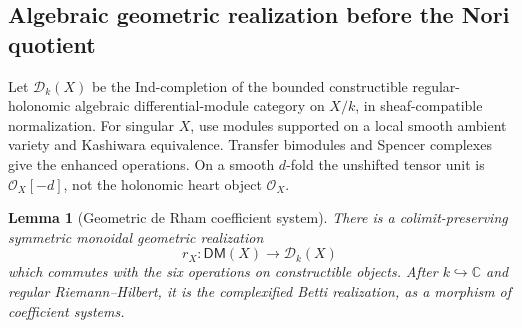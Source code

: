 \documentclass[11pt]{article}
\numberwithin{equation}{section}
\newtheorem{lemma}[lemma]{Lemma}
\theoremstyle{definition}
\theoremstyle{remark}
\newcommand{\C}{\mathbb C}
\newcommand{\Ocal}{\mathcal O}
\begin{document}
\subsection{Algebraic geometric realization before the Nori quotient}

Let $\mathscr D_k(X)$ be the Ind-completion of the bounded constructible
regular-holonomic algebraic differential-module category on $X/k$, in
sheaf-compatible normalization. For singular $X$, use modules supported
on a local smooth ambient variety and Kashiwara equivalence. Transfer
bimodules and Spencer complexes give the enhanced operations. On a smooth
$d$-fold the unshifted tensor unit is $\Ocal_X[-d]$, not the holonomic
heart object $\Ocal_X$.

\begin{lemma}[Geometric de Rham coefficient system]\label{lem:geometric-dR}
There is a colimit-preserving symmetric monoidal geometric realization
\[
 r_X:\mathsf{DM}(X)\longrightarrow\mathscr D_k(X)
\]
which commutes with the six operations on constructible objects. After
$k\hookrightarrow\C$ and regular Riemann--Hilbert, it is the complexified
Betti realization, as a morphism of coefficient systems.
\end{lemma}
\end{document}
